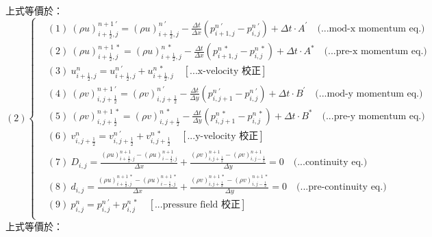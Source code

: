 \documentclass[12pt]{article}
\begin{document}
\noindent 上式等價於：\\
\begin{equation}
(2)
\left\{
\begin{aligned}
    &(1)\ (\rho u)_{i+\frac{1}{2},j}^{n+1\ \prime} = (\rho u)_{i+\frac{1}{2},j}^{n\ \prime} - \frac{\Delta t}{\Delta x}(p_{i+1,j}^{n\ \prime} - p_{i,j}^{n\ \prime}) + \Delta t \cdot A^{\prime}  \quad \text{(...mod-x momentum eq.)}\\[1.5ex]
    &(2)\ (\rho u)_{i+\frac{1}{2},j}^{n+1\ *} = (\rho u)_{i+\frac{1}{2},j}^{n\ *} - \frac{\Delta t}{\Delta x}(p_{i+1,j}^{n\ *} - p_{i,j}^{n\ *}) + \Delta t \cdot A^{*}  \quad \text{(...pre-x momentum eq.)}\\[1.5ex]
    &(3)\ u_{i+\frac{1}{2},j}^{n} = u_{i+\frac{1}{2},j}^{n\ \prime} + u_{i+\frac{1}{2},j}^{n\ *}  \quad \left[\text{...x-velocity 校正}\right]\\[1.5ex]
    &(4)\ (\rho v)_{i,j+\frac{1}{2}}^{n+1\ \prime} = (\rho v)_{i,j+\frac{1}{2}}^{n\ \prime} - \frac{\Delta t}{\Delta y}(p_{i,j+1}^{n\ \prime} - p_{i,j}^{n\ \prime}) + \Delta t \cdot B^{\prime}  \quad \text{(...mod-y momentum eq.)}\\[1.5ex]
    &(5)\ (\rho v)_{i,j+\frac{1}{2}}^{n+1\ *} = (\rho v)_{i,j+\frac{1}{2}}^{n\ *} - \frac{\Delta t}{\Delta y}(p_{i,j+1}^{n\ *} - p_{i,j}^{n\ *}) + \Delta t \cdot B^{*}  \quad \text{(...pre-y momentum eq.)}\\[1.5ex]
    &(6)\ v_{i,j+\frac{1}{2}}^{n} = v_{i,j+\frac{1}{2}}^{n\ \prime} + v_{i,j+\frac{1}{2}}^{n\ *} \quad \left[\text{...y-velocity 校正}\right]\\[1.5ex]
    &(7)\ D_{i,j} = \frac{(\rho u)_{i+\frac{1}{2},j}^{n+1} - (\rho u)_{i-\frac{1}{2},j}^{n+1}}{\Delta x} + \frac{(\rho v)_{i,j+\frac{1}{2}}^{n+1} - (\rho v)_{i,j-\frac{1}{2}}^{n+1}}{\Delta y} = 0 \quad \text{(...continuity eq.)}\\[1.5ex]
    &(8)\ d_{i,j} = \frac{(\rho u)_{i+\frac{1}{2},j}^{n+1\ *} - (\rho u)_{i-\frac{1}{2},j}^{n+1\ *}}{\Delta x} + \frac{(\rho v)_{i,j+\frac{1}{2}}^{n+1\ *} - (\rho v)_{i,j-\frac{1}{2}}^{n+1\ *}}{\Delta y} = 0 \quad \text{(...pre-continuity eq.)}\\[1.5ex]
    &(9)\ p_{i,j}^{n} = p_{i,j}^{n\ \prime} + p_{i,j}^{n\ *} \quad\left[\text{...pressure field 校正}\right]\\[1.5ex]
\end{aligned}
\right.
\end{equation}
\noindent 上式等價於：\\
\end{document}
